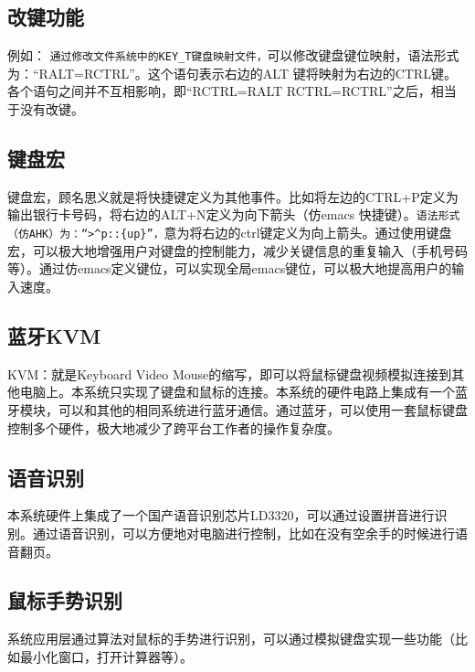 \subsection{改键功能}例如：
\verb|通过修改文件系统中的KEY_T键盘映射文件，|可以修改键盘键位映射，语法形式为：“RALT=RCTRL”。这个语句表示右边的ALT 键将映射为右边的CTRL键。各个语句之间并不互相影响，即“RCTRL=RALT RCTRL=RCTRL”之后，相当于没有改键。

\subsection{键盘宏}
键盘宏，顾名思义就是将快捷键定义为其他事件。比如将左边的CTRL+P定义为输出银行卡号码，将右边的ALT+N定义为向下箭头（仿emacs 快捷键）。\verb|语法形式（仿AHK）为：“>^p::{up}”，|意为将右边的ctrl键定义为向上箭头。通过使用键盘宏，可以极大地增强用户对键盘的控制能力，减少关键信息的重复输入（手机号码等）。通过仿emacs定义键位，可以实现全局emacs键位，可以极大地提高用户的输入速度。

\subsection{蓝牙KVM}
KVM：就是Keyboard Video Mouse的缩写，即可以将鼠标键盘视频模拟连接到其他电脑上。本系统只实现了键盘和鼠标的连接。本系统的硬件电路上集成有一个蓝牙模块，可以和其他的相同系统进行蓝牙通信。通过蓝牙，可以使用一套鼠标键盘控制多个硬件，极大地减少了跨平台工作者的操作复杂度。

\subsection{语音识别}
本系统硬件上集成了一个国产语音识别芯片LD3320，可以通过设置拼音进行识别。通过语音识别，可以方便地对电脑进行控制，比如在没有空余手的时候进行语音翻页。

\subsection{鼠标手势识别}
系统应用层通过算法对鼠标的手势进行识别，可以通过模拟键盘实现一些功能（比如最小化窗口，打开计算器等）。




















